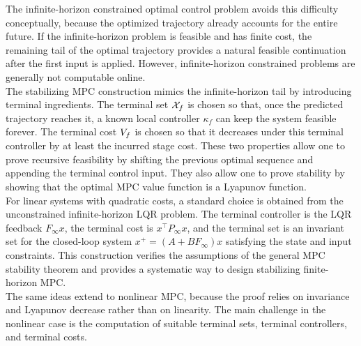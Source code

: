 The infinite-horizon constrained optimal control problem avoids this difficulty conceptually,
because the optimized trajectory already accounts for the entire future. If the infinite-horizon
problem is feasible and has finite cost, the remaining tail of the optimal trajectory provides a
natural feasible continuation after the first input is applied. However, infinite-horizon constrained
problems are generally not computable online.\\
The stabilizing MPC construction mimics the infinite-horizon tail by introducing terminal
ingredients. The terminal set \(\mathcal{X}_f\) is chosen so that, once the predicted trajectory reaches it,
a known local controller \(\kappa_f\) can keep the system feasible forever. The terminal cost
\(V_f\) is chosen so that it decreases under this terminal controller by at least the
incurred stage cost. These two properties allow one to prove recursive feasibility by shifting the
previous optimal sequence and appending the terminal control input. They also allow one to
prove stability by showing that the optimal MPC value function is a Lyapunov function.\\
For linear systems with quadratic costs, a standard choice is obtained from the unconstrained
infinite-horizon LQR problem. The terminal controller is the LQR feedback \(F_\infty x\), the
terminal cost is \(x^\top P_\infty x\), and the terminal set is an invariant set for the closed-loop
system \(x^+=(A+BF_\infty)x\) satisfying the state and input constraints. This construction
verifies the assumptions of the general MPC stability theorem and provides a systematic way to
design stabilizing finite-horizon MPC.\\

The same ideas extend to nonlinear MPC, because the proof relies on invariance and Lyapunov
decrease rather than on linearity. The main challenge in the nonlinear case is the computation
of suitable terminal sets, terminal controllers, and terminal costs.
